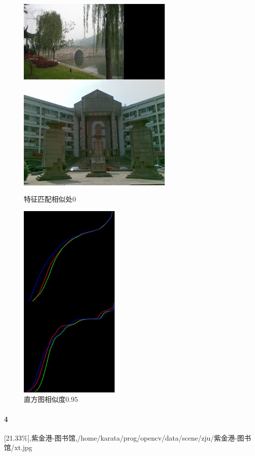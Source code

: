 \begin{figure}[htb]
\begin{minipage}[t]{0.5\linewidth}
\centering
\includegraphics[height=3.8in]{西泠.jpg.d/im3sift.jpg}
\caption{特征匹配相似处0}
\label{fig:side:a}
\end{minipage}%
\begin{minipage}[t]{0.5\linewidth}
\centering
\includegraphics[height=3.8in]{西泠.jpg.d/im3hist2.jpg}
\caption{直方图相似度0.95}
\label{fig:side:a}
\end{minipage}%
\end{figure}

\clearpage
\paragraph{4}
[21.33\%],紫金港-图书馆,/home/karata/prog/opencv/data/scene/zju/紫金港-图书馆/xt.jpg

